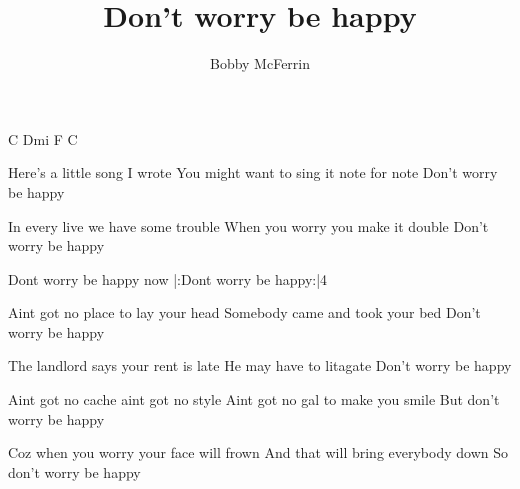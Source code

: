 \beginsong

\title{Don't worry be happy}
\author{Bobby McFerrin}

\intro C Dmi F C

\beginverse
{}Here's a little song I wrote
You might want to sing it note for note
Don't worry be happy
\endverse

\beginverse
{}In every live we have some trouble
When you worry you make it double
Don't worry be happy
\endverse

\beginrefrain
Dont worry be happy now
|:Dont worry be happy:|4
\endrefrain

\beginverse
{}Aint got no place to lay your head
Somebody came and took your bed
Don't worry be happy
\endverse

\beginverse
{}The landlord says your rent is late
He may have to litagate
Don't worry be happy
\endverse


\beginverse
{}Aint got no cache aint got no style
Aint got no gal to make you smile
But don't worry be happy
\endverse

\beginverse
Coz when you worry your face will frown
And that will bring everybody down
So don't worry be happy
\endverse

